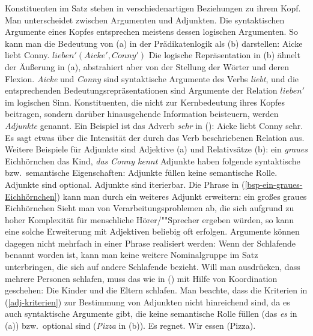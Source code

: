 Konstituenten im Satz stehen in verschiedenartigen Beziehungen zu ihrem Kopf.
Man unterscheidet zwischen Argumenten und Adjunkten. Die syntaktischen Argumente
eines Kopfes entsprechen meistens dessen logischen Argumenten. So kann man
die Bedeutung von (a) in der Prädikatenlogik als (b) darstellen:
\eal
\ex Aicke liebt Conny.
\ex $lieben'(Aicke', Conny')$
\zl
Die logische Repräsentation in (b) ähnelt der Äußerung in (a),
abstrahiert aber von der Stellung der Wörter und deren Flexion.
\emph{Aicke} und \emph{Conny} sind syntaktische Argumente des Verbs \emph{liebt},
und die entsprechenden Bedeutungsrepräsentationen sind Argumente der Relation $lieben'$
im logischen Sinn. 
Konstituenten, die nicht zur Kernbedeutung ihres Kopfes beitragen,
sondern darüber hinausgehende Information beisteuern, werden \emph{Adjunkte}
genannt. Ein Beispiel ist das Adverb \emph{sehr} in ():
\ea
Aicke liebt Conny sehr.
\z
Es sagt etwas über die Intensität der durch das Verb beschriebenen Relation aus.
Weitere Beispiele für Adjunkte sind Adjektive (a) und Relativsätze (b):
\eal
\ex\label{bsp-ein-graues-Eichhörnchen}
ein \emph{graues} Eichhörnchen
\ex das Kind, \emph{das Conny kennt}
\zl
Adjunkte haben folgende syntaktische bzw.\ semantische Eigenschaften:
\eal
\label{adj-kriterien}
\ex Adjunkte füllen keine semantische Rolle.
\ex Adjunkte sind optional.
\ex Adjunkte sind iterierbar.
\zl
Die Phrase in (\ref{bsp-ein-graues-Eichhörnchen}) kann man durch ein weiteres Adjunkt erweitern:
\ea
ein großes graues Eichhörnchen
\z
Sieht man von Verarbeitungsproblemen ab, die sich aufgrund zu hoher Komplexität
für menschliche Hörer/""Sprecher ergeben würden, so kann eine solche Erweiterung
mit Adjektiven beliebig oft erfolgen. Argumente können dagegen nicht mehrfach 
in einer Phrase realisiert werden:
\z
Wenn der Schlafende benannt worden ist, kann man keine weitere Nominalgruppe
im Satz unterbringen, die sich auf andere Schlafende bezieht. Will man ausdrücken,
dass mehrere Personen schlafen, muss das wie in () mit Hilfe von
Koordination geschehen:
\ea
Die Kinder und die Eltern schlafen.
\z
Man beachte, dass die Kriterien in (\ref{adj-kriterien}) zur Bestimmung von Adjunkten
nicht hinreichend sind, da es auch syntaktische
Argumente gibt, die keine semantische Rolle füllen (das \emph{es} in (a)) bzw.\ optional
sind (\emph{Pizza} in (b)).
\eal
\ex Es regnet.
\ex Wir essen (Pizza).
\zl

